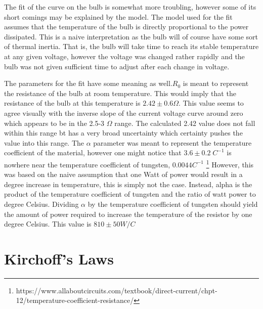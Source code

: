 \documentclass[11pt]{article}
\begin{document}
The fit of the curve on the bulb is somewhat more troubling, however some of its short comings may be explained by the model. The model used for the fit assumes that the temperature of the bulb is directly proportional to the power dissipated. This is a naive interpretation as the bulb will of course have some sort of thermal inertia. That is, the bulb will take time to reach its stable temperature at any given voltage, however the voltage was changed rather rapidly and the bulb was not given sufficient time to adjust after each change in voltage.

The parameters for the fit have some meaning as well.\(R_0\) is meant to represent the resistance of the bulb at room temperature. This would imply that the resistance of the bulb at this temperature is \(  2.42 \pm 0.6 \Omega \). This value seems to agree visually with the inverse slope of the current voltage curve around zero which appears to be in the 2.5-3 \(\Omega\) range. The calculated 2.42 value does not fall within this range bt has a very broad uncertainty which certainty pushes the value into this range. The \( \alpha \) parameter was meant to represent the temperature coefficient of the  material, however one might notice that \(3.6 \pm 0.2 \; C^{-1} \) is nowhere near the temperature coefficient of tungsten, \( 0.0044 C^{-1}\) \footnote{https://www.allaboutcircuits.com/textbook/direct-current/chpt-12/temperature-coefficient-resistance/}
However, this was based on the naive assumption that one Watt of power would result in a degree increase in temperature, this is simply not the case. Instead, alpha is the product of the temperature coefficient of tungsten and the ratio of watt power to degree Celsius. Dividing \(  \alpha\) by the temperature coefficient of tungsten should yield the amount of power required to increase the temperature of the resistor by one degree Celsius. This value is \(810 \pm 50 W/C\)

\section{Kirchoff's Laws}
\end{document}
